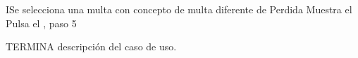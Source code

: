 		\begin{UCtrayectoriaA}{I}{Se selecciona una multa con concepto de multa diferente de Perdida}
			\UCpaso[\UCsist] Muestra el 
			\UCpaso[\UCactor] Pulsa el , paso 5 
		\end{UCtrayectoriaA}
	
TERMINA descripción del caso de uso.